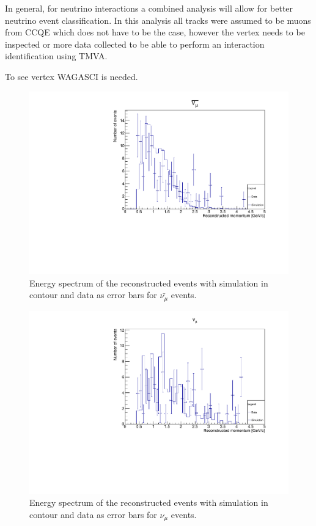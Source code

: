 In general, for neutrino interactions a combined analysis will allow for better neutrino event classification. In this analysis all tracks were assumed to be muons from CCQE which does not have to be the case, however the vertex needs to be inspected or more data collected to be able to perform an interaction identification using TMVA. 

To see vertex WAGASCI is needed.




\begin{figure}[h!]
\centering
\includegraphics[width=.9\textwidth]{figures/NeutrinoChap/nuBarEventNewer.pdf}
\caption{Energy spectrum of the reconstructed events with simulation in contour and data as error bars for $\bar{\nu_\mu}$ events.}
\label{fig:datanumubar}
\end{figure}

\begin{figure}[h!]
\centering
\includegraphics[width=.9\textwidth]{figures/NeutrinoChap/nuEventNewer.pdf}
\caption{Energy spectrum of the reconstructed events with simulation in contour and data as error bars for $\nu_\mu$ events.}
\label{fig:datanumu}
\end{figure}



